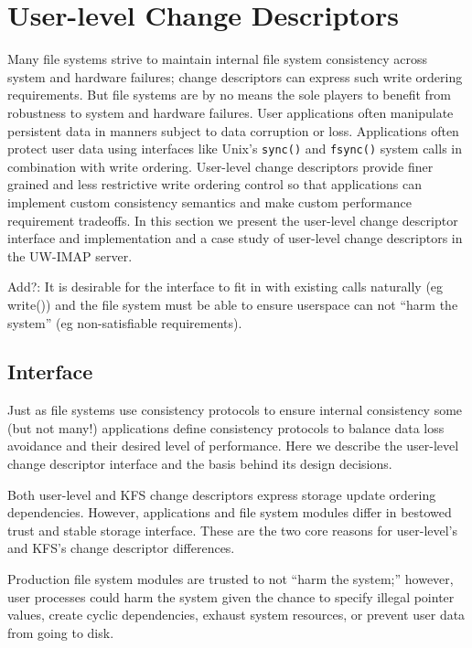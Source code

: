 \section{User-level Change Descriptors}
\label{sec:opgroup}

Many file systems strive to maintain internal file system consistency
across system and hardware failures; change descriptors can express
such write ordering requirements. But file systems are by no means the
sole players to benefit from robustness to system and hardware
failures. User applications often manipulate persistent data in
manners subject to data corruption or loss. Applications often protect
user data using interfaces like Unix's \texttt{sync()} and
\texttt{fsync()} system calls in combination with write ordering.
User-level change descriptors provide finer grained and less
restrictive write ordering control so that applications can implement
custom consistency semantics and make custom performance requirement
tradeoffs. In this section we present the user-level change descriptor
interface and implementation and a case study of user-level change
descriptors in the UW-IMAP server.

Add?: It is desirable for the interface to fit in with existing calls
naturally (eg write()) and the file system must be able to ensure
userspace can not ``harm the system'' (eg non-satisfiable
requirements).

\subsection{Interface}

Just as file systems use consistency protocols to ensure internal
consistency some (but not many!) applications define consistency
protocols to balance data loss avoidance and their desired level of
performance. Here we describe the user-level change descriptor
interface and the basis behind its design decisions.

Both user-level and KFS change descriptors express storage update
ordering dependencies. However, applications and file system modules
differ in bestowed trust and stable storage interface. These are the
two core reasons for user-level's and KFS's change descriptor
differences.

Production file system modules are trusted to not ``harm the system;''
however, user processes could harm the system given the chance to
specify illegal pointer values, create cyclic dependencies, exhaust
system resources, or prevent user data from going to disk.

